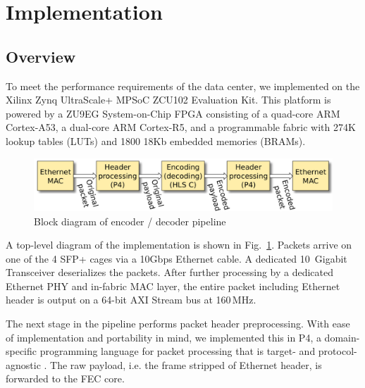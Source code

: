 \section{Implementation}
\label{sec:implementation}

\newcommand{\leicom}[1]{{\color{blue}{[\textbf{Lei Comment:} #1]}}}

\subsection{Overview}

To meet the performance requirements of the data center, we implemented \OurSys
on the Xilinx Zynq UltraScale+ MPSoC ZCU102 Evaluation Kit.  This platform is
powered by a ZU9EG System-on-Chip FPGA consisting of a quad-core ARM Cortex-A53, a
dual-core ARM Cortex-R5, and a programmable fabric with 274K lookup tables
(LUTs) and 1800 18Kb embedded memories (BRAMs).

\begin{figure}
  \centering
  \includegraphics[width=0.4\paperwidth]{Top_level.pdf}
  \caption{\label{fig:toplevel} Block diagram of encoder / decoder pipeline}
\end{figure}

A top-level diagram of the implementation is shown in Fig.~\ref{fig:toplevel}.
Packets arrive on one of the 4 SFP+ cages via a 10Gbps Ethernet cable.
A dedicated 10~Gigabit Transceiver deserializes the packets.  After further
processing by a dedicated Ethernet PHY and in-fabric MAC layer, the entire
packet including Ethernet header is output on a 64-bit AXI Stream bus at 160\,MHz.

The next stage in the pipeline performs packet header preprocessing.  With
ease of implementation and portability in mind, we implemented this in P4, a
domain-specific programming language for packet processing that is target- and
protocol-agnostic \cite{p4_sigcomm_review2014}.  The raw payload, i.e. the frame stripped of Ethernet
header, is forwarded to the FEC core.  

